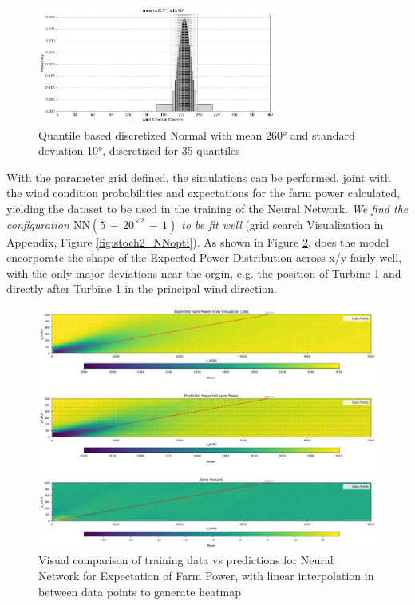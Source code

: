 \documentclass[preprint,12pt]{elsarticle}
\begin{document}
\begin{figure}[h] 
	\centering
	\includegraphics[width=0.7\textwidth]{../figures/optimization/stoch2/dist_discret.png} 
	\caption{Quantile based discretized Normal with mean 260° and standard deviation 10°, discretized for 35 quantiles}
	\label{fig:stoch2_dist}
\end{figure} 

With the parameter grid defined, the simulations can be performed, joint with the wind condition probabilities and expectations for the farm power calculated, yielding the dataset to be used in the training of the Neural Network. \textit{We find the configuration $\text{NN}(5\,{-}\,20^{\times2}\,{-}\,1)$ to be fit well} (grid search Visualization in Appendix, Figure \ref{fig:stoch2_NNopti}). As shown in Figure \ref{fig:stoch2_heatmap_inspect_NN}, does the model encorporate the shape of the Expected Power Distribution across x/y fairly well, with the only major deviations near the orgin, e.g. the position of Turbine 1 and directly after Turbine 1 in the principal wind direction. 

\begin{figure}[h] 
	\centering
	\includegraphics[width=1\textwidth]{../figures/optimization/stoch2/stoch2_heatmap_inspect_NN.png} 
	\caption{Visual comparison of training data vs predictions for Neural Network for Expectation of Farm Power, with linear interpolation in between data points to generate heatmap}
	\label{fig:stoch2_heatmap_inspect_NN}
\end{figure} 
\end{document}
